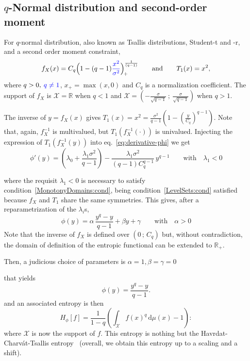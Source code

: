 \documentclass[entropy,article,submit,moreauthors,pdftex]{Definitions/mdpi}
\newcommand{\SZ}[1]{{\color{blue} #1}}                                       %
\def\dmu{\mathrm{d}\mu}%
\def\Rset{\mathbb{R}}%
\def\X{\mathcal{X}}%
\begin{document}

\subsection{$q$-Normal distribution and second-order moment}
\label{subsecapp:qNormalSecondOrder}

For $q$-normal distribution, also known  as Tsallis distributions, Student-t and
-r, and a second order moment constraint,
%
\[
f_X(x)     =    C_q     \Big(     1     -    (q-1)     \SZ{\frac{x^2}{\sigma^2}}
\Big)_{\!+}^{\frac{1}{(q-1)}} \qquad \mbox{and} \qquad T_1(x) = x^2,
\]
%
where $q > 0,  \: \SZ{q \ne 1}$, $x_+ = \max(x,0)$ and  $C_q$ is a normalization
coefficient.   \SZ{The support  of  $f_X$ is  $\X  =  \Rset$ when  $q  < 1$  and
  $\displaystyle   \X   =   \left(   -   \frac{\sigma}{\sqrt{q-1}}   \:   ;   \:
  \frac{\sigma}{\sqrt{q-1}} \right)$ when $q > 1$.}

\SZ{The  inverse of  $y =  f_X(x)$ gives  $T_1(x) =  x^2 =  \frac{\sigma^2}{q-1}
  \left( 1  - \left(  \frac{y}{C_q} \right)^{q-1}  \right)$.  Note  that, again,
  $f_X^{-1}$  is  multivalued, but  $T_1\left(  f_X^{-1}(  \cdot )  \right)$  is
  univalued.  Injecting  the expression of $T_1\left(  f_X^{-1}(y) \right)$ into
  eq.~\eqref{eq:derivative-phi} we get}
%
\[
\phi'(y)  =   \left(  \lambda_0  +  \frac{\lambda_1   \sigma^2}{q-1}  \right)  -
\frac{\lambda_1  \sigma^2}{(q-1)  C_q^{q-1}}  \, y^{q-1}  \qquad  \mbox{with}  \quad
\lambda_1 < 0
\]
%
\SZ{where   the    requisit   $\lambda_1    <0$   is   necessary    to   satisfy
  condition~\ref{MonotonyDomains:cond},   being   condition~\ref{LevelSets:cond}
  satisfied because $f_X$ and $T_1$ share the same symmetries. This gives, after
  a reparametrization of the $\lambda_i$s,
  \[
  \phi(y) = \alpha \,  \frac{y^q - y}{q-1} + \beta y  + \gamma \qquad \mbox{with}
  \quad \alpha > 0
  \]
  Note that the inverse of $f_X$ is defined  over $\left( 0 \, ; \, C_q \right)$
  but,  without  contradiction,  the  domain   of  definition  of  the  entropic
  functional can be extended to $\Rset_+$.
  
Then, a judicious choice of parameters is $\alpha = 1, \beta = \gamma = 0$}
%
%
that yields
%
\[
\phi(y) = \frac{y^q-y}{q-1}.
\]
%
and an associated entropy is then 
%
\[
H_\phi[f] = \frac{1}{1-q} \left( \int_\X f(x)^q \, \dmu(x) - 1 \right):
\]
\SZ{where $\X$ is now the support of $f$.}
%
\SZ{This    entropy}    is    nothing    but    the    Havrdat-Charv\'at-Tsallis
entropy~\cite{HavCha67,  Dar70, Tsa88,  CosHer03} \SZ{(overall,  we obtain  this
  entropy up to a scaling and a shift).}
\end{document}
